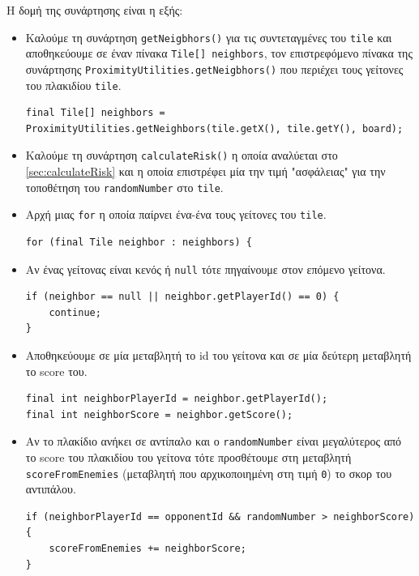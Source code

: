 Η δομή της συνάρτησης είναι η εξής:\begin{itemize}
\item Καλούμε τη συνάρτηση \lstinline!getNeigbhors()! για τις συντεταγμένες του \lstinline!tile! και αποθηκεύουμε σε έναν πίνακα \lstinline!Tile[] neighbors!,
τον επιστρεφόμενο πίνακα της συνάρτησης \lstinline!ProximityUtilities.getNeigbhors()! που περιέχει τους γείτονες του πλακιδίου \lstinline!tile!.
\begin{lstlisting}[numbers=none, aboveskip=\smallskipamount, belowskip=\smallskipamount, captionpos=none]
final Tile[] neighbors = ProximityUtilities.getNeighbors(tile.getX(), tile.getY(), board);
\end{lstlisting}

\item Καλούμε τη συνάρτηση \lstinline!calculateRisk()! η οποία αναλύεται στο
\hyperref[sec:calculateRisk]{\ref{sec:calculateRisk}}
και η οποία επιστρέφει μία την τιμή "ασφάλειας" για την τοποθέτηση του \lstinline!randomNumber!
στο \lstinline!tile!.

\item Αρχή μιας \lstinline!for! η οποία παίρνει ένα-ένα τους γείτονες του \lstinline!tile!.
\begin{lstlisting}[numbers=none, aboveskip=\smallskipamount, belowskip=\smallskipamount, captionpos=none]
for (final Tile neighbor : neighbors) {
\end{lstlisting}

\item Αν ένας γείτονας είναι κενός ή \lstinline!null! τότε πηγαίνουμε στον επόμενο γείτονα.
\begin{lstlisting}[numbers=none, aboveskip=\smallskipamount, belowskip=\smallskipamount, captionpos=none]
if (neighbor == null || neighbor.getPlayerId() == 0) {
    continue;
}
\end{lstlisting}

\item Αποθηκεύουμε σε μία μεταβλητή το id του γείτονα και σε μία δεύτερη μεταβλητή το score του.
\begin{lstlisting}[numbers=none, aboveskip=\smallskipamount, belowskip=\smallskipamount, captionpos=none]
final int neighborPlayerId = neighbor.getPlayerId();
final int neighborScore = neighbor.getScore();
\end{lstlisting}

\item \begin{sloppypar}Αν το πλακίδιο ανήκει σε αντίπαλο και ο \lstinline!randomNumber! είναι μεγαλύτερος από το score του πλακιδίου του γείτονα τότε προσθέτουμε στη μεταβλητή \lstinline!scoreFromEnemies!
(μεταβλητή που αρχικοποιημένη στη τιμή \lstinline!0!) το σκορ του αντιπάλου.\end{sloppypar}
\begin{lstlisting}[numbers=none, aboveskip=\smallskipamount, belowskip=\smallskipamount, captionpos=none]
if (neighborPlayerId == opponentId && randomNumber > neighborScore) {
    scoreFromEnemies += neighborScore;
}
\end{lstlisting}


\end{itemize}
